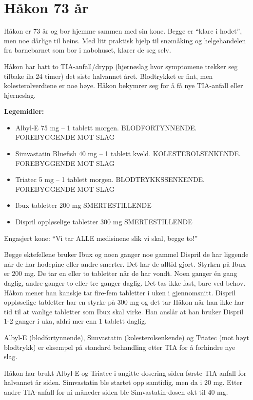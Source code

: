 \chapter{Håkon 73 år} \label{chap:haakon}

Håkon er 73 år og bor hjemme sammen med sin kone. Begge er ``klare i hodet'', men noe dårlige til beins. Med litt praktisk hjelp til snømåking og helgehandelen fra barnebarnet som bor i nabohuset, klarer de seg selv. 

Håkon har hatt to TIA-anfall/drypp (hjerneslag hvor symptomene trekker seg tilbake ila 24 timer) det siste halvannet året. Blodtrykket er fint, men kolesterolverdiene er noe høye. Håkon bekymrer seg for å få nye TIA-anfall eller hjerneslag.

\textbf{Legemidler:}
\begin{itemize}
\item Albyl-E 75 mg – 1 tablett morgen. BLODFORTYNNENDE. FOREBYGGENDE MOT SLAG
\item Simvastatin Bluefish 40 mg – 1 tablett kveld.  KOLESTEROLSENKENDE. FOREBYGGENDE MOT SLAG
\item Triatec 5 mg – 1 tablett morgen.  BLODTRYKKSSENKENDE. FOREBYGGENDE MOT SLAG
\item Ibux tabletter 200 mg SMERTESTILLENDE
\item Dispril oppløselige tabletter 300 mg  SMERTESTILLENDE
\end{itemize}

Engasjert kone: ``Vi tar ALLE medisinene slik vi skal, begge to!'' 

Begge ektefellene bruker Ibux og noen ganger noe gammel Dispril de har liggende når de har hodepine eller andre smerter. Det har de alltid gjort. Styrken på Ibux er 200 mg. De tar en eller to tabletter når de har vondt. Noen ganger én gang daglig, andre ganger to eller tre ganger daglig. Det tas ikke fast, bare ved behov. Håkon mener han kanskje tar fire-fem tabletter i uken i gjennomsnitt. Dispril oppløselige tabletter har en styrke på 300 mg og det tar Håkon når han ikke har tid til at vanlige tabletter som Ibux skal virke. Han anslår at han bruker Dispril 1-2 ganger i uka, aldri mer enn 1 tablett daglig.

Albyl-E (blodfortynnende), Simvastatin (kolesterolsenkende) og Triatec (mot høyt blodtrykk) er eksempel på standard behandling etter TIA for å forhindre nye slag.  

Håkon har brukt Albyl-E og Triatec i angitte dosering siden første TIA-anfall for halvannet år siden. Simvastatin ble startet opp samtidig, men da i 20 mg. Etter andre TIA-anfall for ni måneder siden ble Simvastatin-dosen økt til 40 mg.

